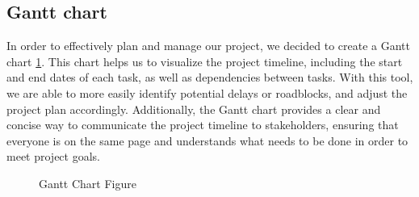 \documentclass[12pt, a4paper, twocolumn]{article}
\begin{document}
		\subsection{Gantt chart}
		In order to effectively plan and manage our project, we decided to create a Gantt chart \ref{fig:gantt}. This chart helps us to visualize the project timeline, including the start and end dates of each task, as well as dependencies between tasks. With this tool, we are able to more easily identify potential delays or roadblocks, and adjust the project plan accordingly. Additionally, the Gantt chart provides a clear and concise way to communicate the project timeline to stakeholders, ensuring that everyone is on the same page and understands what needs to be done in order to meet project goals.

		\begin{figure}[!ht]
				\centering
				\caption[Gantt Chart Figure]{Gantt Chart Figure} 
				\label{fig:gantt}
		\end{figure}

	
\end{document}
